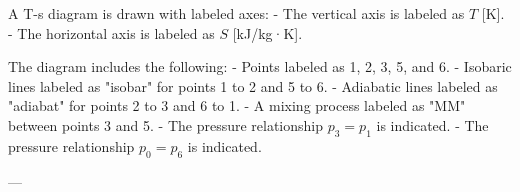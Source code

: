A T-s diagram is drawn with labeled axes:  
- The vertical axis is labeled as \( T \) [K].  
- The horizontal axis is labeled as \( S \) [kJ/kg·K].  

The diagram includes the following:  
- Points labeled as 1, 2, 3, 5, and 6.  
- Isobaric lines labeled as "isobar" for points 1 to 2 and 5 to 6.  
- Adiabatic lines labeled as "adiabat" for points 2 to 3 and 6 to 1.  
- A mixing process labeled as "MM" between points 3 and 5.  
- The pressure relationship \( p_3 = p_1 \) is indicated.  
- The pressure relationship \( p_0 = p_6 \) is indicated.  

---